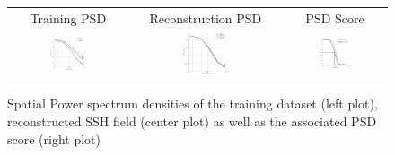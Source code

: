 \documentclass[draft]{agujournal2019}
\begin{document}
\begin{figure}[H]
\small
\begin{center}
\setlength{\tabcolsep}{1pt}
\begin{tabular}{ccc}

\hspace{3mm} Training PSD & 
\hspace{3mm} Reconstruction PSD & 
\hspace{3mm} PSD Score  \\


\includegraphics[width=0.32\textwidth]{figures/plots/isotrop_psd_res_train.png} &
\includegraphics[width=0.32\textwidth]{figures/plots/isotrop_psd_res_rec.png} &
\includegraphics[width=0.32\textwidth]{figures/plots/res_1d_psd_score.png}


\end{tabular}
\vspace{-3mm}
\caption{
Spatial Power spectrum densities of the training dataset (left plot), reconstructed SSH field (center plot) as well as the associated PSD score (right plot)}\vspace{-5mm}
\label{fig:respsd}
\end{center}
\end{figure}
\end{document}
